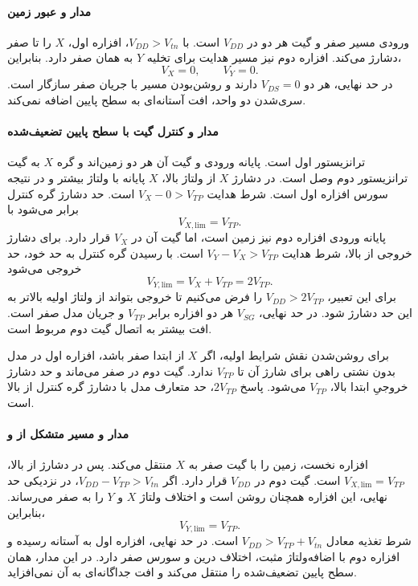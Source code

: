 \paragraph*{مدار  و عبور زمین}
ورودی مسیر صفر و گیت هر دو  در \(V_{DD}\) است.
با \(V_{DD}>V_{tn}\)، افزاره اول، \(X\) را تا صفر دشارژ
می‌کند. افزاره دوم نیز مسیر هدایت برای تخلیه \(Y\) به
همان صفر دارد. بنابراین،
\begin{equation*}
 \boxed{V_X=0,\qquad V_Y=0}.
\end{equation*}
در حد نهایی، هر دو \(V_{DS}=0\) دارند و روشن‌بودن مسیر
با جریان صفر سازگار است. سری‌شدن دو واحد، افت آستانه‌ای
به سطح پایین اضافه نمی‌کند.

\paragraph*{مدار  و کنترل گیت با سطح پایین تضعیف‌شده}
ترانزیستور اول  است. پایانه ورودی و گیت آن هر دو
زمین‌اند و گره \(X\) به گیت ترانزیستور دوم وصل است.
در دشارژ \(X\) از ولتاژ بالا، \(X\) پایانه با ولتاژ بیشتر
و در نتیجه سورس افزاره اول است. شرط هدایت
\(V_X-0>V_{TP}\) است. حد دشارژ گره کنترل برابر می‌شود با
\begin{equation*}
 V_{X,\mathrm{lim}}=V_{TP}.
\end{equation*}
پایانه ورودی افزاره دوم نیز زمین است، اما گیت آن در
\(V_X\) قرار دارد. برای دشارژ خروجی از بالا، شرط هدایت
\(V_Y-V_X>V_{TP}\) است. با رسیدن گره کنترل به حد خود،
حد خروجی می‌شود
\begin{equation*}
 \boxed{V_{Y,\mathrm{lim}}=V_X+V_{TP}=2V_{TP}}.
\end{equation*}
برای این تعبیر، \(V_{DD}>2V_{TP}\) را فرض می‌کنیم تا
خروجی بتواند از ولتاژ اولیه بالاتر به این حد دشارژ شود.
در حد نهایی، \(V_{SG}\) هر دو افزاره برابر \(V_{TP}\)
و جریان مدل صفر است. افت بیشتر به اتصال گیت دوم مربوط است.

برای روشن‌شدن نقش شرایط اولیه، اگر \(X\) از ابتدا صفر
باشد، افزاره اول در مدل بدون نشتی راهی برای شارژ آن تا
\(V_{TP}\) ندارد. گیت دوم در صفر می‌ماند و حد دشارژ
خروجیِ ابتدا بالا، \(V_{TP}\) می‌شود. پاسخ
\(2V_{TP}\)، حد متعارف مدل با دشارژ گره کنترل از بالا است.

\paragraph*{مدار  و مسیر متشکل از  و }
افزاره نخست، زمین را با گیت صفر به \(X\) منتقل می‌کند.
پس در دشارژ از بالا، \(V_{X,\mathrm{lim}}=V_{TP}\) است.
گیت  دوم در \(V_{DD}\) قرار دارد.
اگر \(V_{DD}-V_{TP}>V_{tn}\)، در نزدیکی حد نهایی،
این افزاره همچنان روشن است و اختلاف ولتاژ \(X\) و \(Y\)
را به صفر می‌رساند. بنابراین،
\begin{equation*}
 \boxed{V_{Y,\mathrm{lim}}=V_{TP}}.
\end{equation*}
شرط تغذیه معادل \(V_{DD}>V_{TP}+V_{tn}\) است.
در حد نهایی، افزاره اول به آستانه رسیده و افزاره دوم با
اضافه‌ولتاژ مثبت، اختلاف درین و سورس صفر دارد.
در این مدار،  همان سطح پایین تضعیف‌شده را منتقل
می‌کند و افت جداگانه‌ای به آن نمی‌افزاید.

